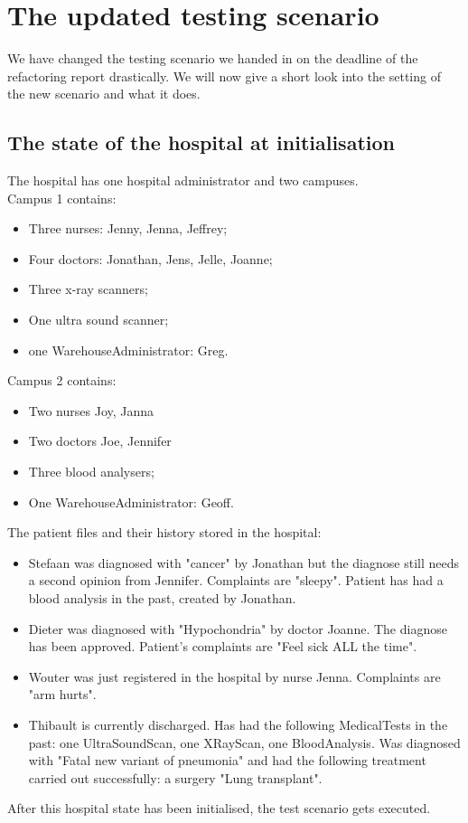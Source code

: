 \documentclass[12pt]{article}
\begin{document}
\section{The updated testing scenario}
We have changed the testing scenario we handed in on the deadline of the refactoring report drastically. We will now give a short look into the setting of the new scenario and what it does.
\subsection{The state of the hospital at initialisation}
The hospital has one hospital administrator and two campuses.\\
Campus 1 contains: 
\begin{itemize}
\item{Three nurses: Jenny, Jenna, Jeffrey;}
\item{Four doctors: Jonathan, Jens, Jelle, Joanne;}
\item{Three x-ray scanners;}
\item{One ultra sound scanner;}
\item{one WarehouseAdministrator: Greg.}
\end{itemize}
Campus 2 contains:
\begin{itemize}
\item{Two nurses Joy, Janna}
\item{Two doctors Joe, Jennifer}
\item{Three blood analysers;}
\item{One WarehouseAdministrator: Geoff.}
\end{itemize}
The patient files and their history stored in the hospital:
\begin{itemize}
\item{Stefaan was diagnosed with "cancer" by Jonathan but the diagnose still needs a second opinion from Jennifer. Complaints are "sleepy". Patient has had a blood analysis in the past, created by Jonathan.}
\item{Dieter was diagnosed with "Hypochondria" by doctor Joanne. The diagnose has been approved. Patient's complaints are "Feel sick ALL the time".}
\item{Wouter was just registered in the hospital by nurse Jenna. Complaints are "arm hurts".}
\item{Thibault is currently discharged. Has had the following MedicalTests in the past: one UltraSoundScan, one XRayScan, one BloodAnalysis. Was diagnosed with "Fatal new variant of pneumonia" and had the following treatment carried out successfully: a surgery "Lung transplant".}
\end{itemize}
After this hospital state has been initialised, the test scenario gets executed.
\end{document}
